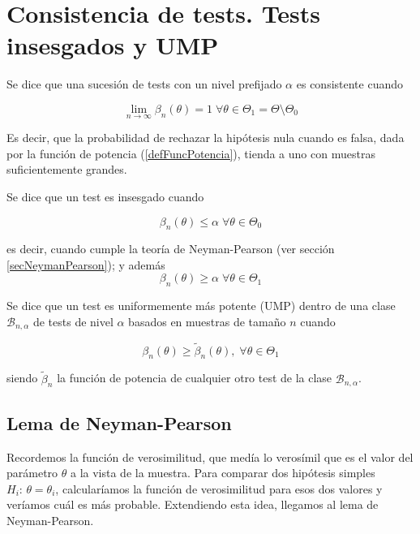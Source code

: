 \documentclass{apuntes}
\begin{document}
\newpage
\section{Consistencia de tests. Tests insesgados y UMP}

\begin{defn} Se dice que una sucesión de tests con un nivel prefijado $\alpha$ es consistente cuando

\[
\lim_{n \to \infty} \beta_n(\theta) =
1 \; \forall \theta \in \Theta_1 =
\Theta \setminus \Theta_0
\]

Es decir, que la probabilidad de rechazar la hipótesis nula cuando es falsa, dada por la función de potencia (\ref{defFuncPotencia}), tienda a uno con muestras suficientemente grandes.
\end{defn}

\begin{defn} Se dice que un test es insesgado cuando

\[ \beta_n(\theta) \leq \alpha \; \forall \theta \in \Theta_0 \]

es decir, cuando cumple la teoría de Neyman-Pearson (ver sección \ref{secNeymanPearson}); y además
\[\beta_n(\theta)\geq\alpha \;\forall\theta\in\Theta_1 \]
\end{defn}

\begin{defn} Se dice que un test es uniformemente más potente (UMP) dentro de una clase $\mathcal{B}_{n,\alpha}$ de tests de nivel $\alpha$ basados en muestras de tamaño $n$ cuando

\[ \beta_n(\theta) \geq \tilde{\beta}_n(\theta), \; \forall \theta \in \Theta_1 \]

siendo $\tilde{\beta}_n$ la función de potencia de cualquier otro test de la clase  $\mathcal{B}_{n,\alpha}$.
\end{defn}

\subsection{Lema de Neyman-Pearson}

Recordemos la función de verosimilitud, que medía lo verosímil que es el valor del parámetro $\theta$ a la vista de la muestra. Para comparar dos hipótesis simples $H_i: \, \theta = \theta_i$, calcularíamos la función de verosimilitud para esos dos valores y veríamos cuál es más probable. Extendiendo esta idea, llegamos al lema de Neyman-Pearson.
\end{document}
